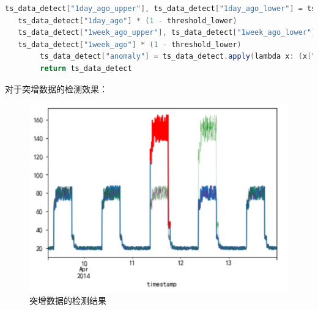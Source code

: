 \begin{longtable}[htbp]
\begin{lrbox}{\AnulusAnomalyDetectorOne}
\begin{lstlisting}[language=Java]
\end{lstlisting}  
\end{lrbox} 
\begin{table}[h]   
\caption{周期环比检测算法}  
\label{tab:AnulusAnomalyDetectorOne}  
\usebox{\AnulusAnomalyDetectorOne}  
\end{table} 

\begin{lrbox}{\AnulusAnomalyDetectorTwo}  
\begin{lstlisting}[language=Java]
   ts_data_detect["1day_ago_upper"], ts_data_detect["1day_ago_lower"] = ts_data_detect["1day_ago"] * (1 + threshold_upper), 
   ts_data_detect["1day_ago"] * (1 - threshold_lower)
   ts_data_detect["1week_ago_upper"], ts_data_detect["1week_ago_lower"] = ts_data_detect["1week_ago"] * (1 + threshold_upper), 
   ts_data_detect["1week_ago"] * (1 - threshold_lower)
        ts_data_detect["anomaly"] = ts_data_detect.apply(lambda x: (x["1week_ago_lower"] > x[metric_name] or (x[metric_name] > x["1day_ago_upper"])) and (x["1week_ago_lower"] > x[metric_name] or x[metric_name] > x["1week_ago_upper"]), axis=1).values
        return ts_data_detect
\end{lstlisting}  
\end{lrbox} 
\begin{table}[h]   
\label{tab:AnulusAnomalyDetectorTwo}  
\usebox{\AnulusAnomalyDetectorTwo}  
\end{table} 









\newpage
对于突增数据的检测效果：
   \begin{figure}[htbp]
  \centering
  \includegraphics[scale=0.8]{figure/chapter5/突增数据的检测结果.png}
  \caption{突增数据的检测结果}\label{tuzengshujujiance}
\end{figure}



\end{longtable}
